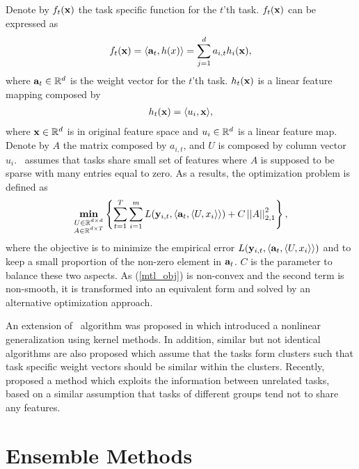 {Denote by $f_t(\mathbf {x})$ the task specific function for the $t$'th task.
$f_t(\mathbf {x})$ can be expressed as
\begin{align*}
	f_t(\mathbf {x}) = \langle \mathbf {a}_t, h(x) \rangle = \sum_{j=1}^{d}a_{i,t}h_i(\mathbf {x}),
\end{align*}
where $\mathbf {a}_t\in\mathbb{R}^d$ is the weight vector for the $t$'th task.
$h_t(\mathbf {x})$ is a linear feature mapping composed by
\begin{align*}
	h_t(\mathbf {x}) = \langle u_i, \mathbf {x} \rangle,
\end{align*}
where $\mathbf {x}\in\mathbb{R}^d$ is in original feature space and $u_i\in\mathbb{R}^d$ is a linear feature map.
Denote by $A$ the matrix composed by $a_{i,t}$, and $U$ is composed by column vector $u_i$.
\mtl\ assumes that tasks share small set of features where $A$ is supposed to be sparse with many entries equal to zero.
As a results, the optimization problem is defined as
\begin{align}
	\underset{\substack{U\in\mathbb{R}^{d\times d}\\A\in\mathbb{R}^{d\times T}}}{\textbf{min}} \left\{\sum_{t=1}^{T}\sum_{i=1}^{m}L(\mathbf {y}_{i,t},\langle \mathbf {a}_t, \langle U, x_i \rangle \rangle)+C\left|\left| A \right|\right|_{2,1}^2\right\},\label{mtl_obj}
\end{align}
where the objective is to minimize the empirical error $L(\mathbf {y}_{i,t},\langle \mathbf {a}_t, \langle U, x_i \rangle \rangle)$ and to keep a small proportion of the non-zero element in $\mathbf {a}_t$.
$C$ is the parameter to balance these two aspects.
As (\ref{mtl_obj}) is non-convex and the second term is non-smooth, it is transformed into an equivalent form and solved by an alternative optimization approach.

An extension of \mtl\ algorithm was proposed in \citep{Argyriou08convex} which introduced a nonlinear generalization using kernel methods.
In addition, similar but not identical algorithms \citep{Argyriou08an,Jacob09cluster} are also proposed which assume that the tasks form clusters such that task specific weight vectors should be similar within the clusters.
Recently, \citet{Paredes12exploit} proposed a method which exploits the information between unrelated tasks, based on a similar assumption that tasks of different groups tend not to share any features.

%
\section{Ensemble Methods}

}
